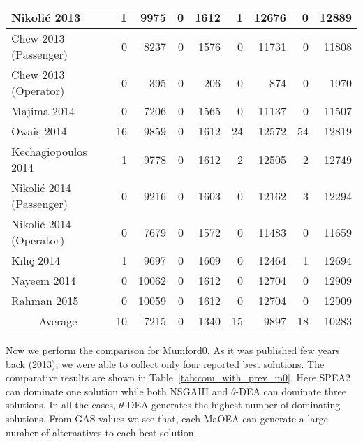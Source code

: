 \begin{table}[!htbp]
\begin{tabular}{|l|r|r||r|r||r|r||r|r|}
		\hline
		Nikoli{\'c} 2013~\cite{nikolic2013transit} & 1     & 9975  & 0     & 1612  & 1     & 12676 & 0     & 12889 \\
		\hline
		Chew 2013 (Passenger)~\cite{chew2013genetic} & 0     & 8237  & 0     & 1576  & 0     & 11731 & 0     & 11808 \\
		\hline
		Chew 2013 (Operator)~\cite{chew2013genetic} & 0     & 395   & 0     & 206   & 0     & 874   & 0     & 1970 \\
		\hline
		Majima 2014~\cite{majima2014application} & 0     & 7206  & 0     & 1565  & 0     & 11137 & 0     & 11507 \\
		\hline
		Owais 2014~\cite{owais2014simple} & 16    & 9859  & 0     & 1612  & 24    & 12572 & 54    & 12819 \\
		\hline
		Kechagiopoulos 2014~\cite{kechagiopoulos2014solving} & 1     & 9778  & 0     & 1612  & 2     & 12505 & 2     & 12749 \\
		\hline
		Nikoli{\'c} 2014 (Passenger)~\cite{nikolic2014simultaneous} & 0     & 9216  & 0     & 1603  & 0     & 12162 & 3     & 12294 \\
		\hline
		Nikoli{\'c} 2014 (Operator)~\cite{nikolic2014simultaneous} & 0     & 7679  & 0     & 1572  & 0     & 11483 & 0     & 11659 \\
		\hline
		K{\i}l{\i}{\c{c}} 2014~\cite{kilicc2014demand} & 1     & 9697  & 0     & 1609  & 0     & 12464 & 1     & 12694 \\
		\hline
		Nayeem 2014~\cite{nayeem2014transit} & 0     & 10062 & 0     & 1612  & 0     & 12704 & 0     & 12909 \\
		\hline
		Rahman 2015~\cite{rahman2015transit} & 0     & 10059 & 0     & 1612  & 0     & 12704 & 0     & 12909 \\
		\hline
		\hline
		\multicolumn{1}{|c|}{Average} & 10    & 7215  & 0     & 1340  & 15    & 9897  & 18    & 10283 \\
		\hline
	\end{tabular}%
	\label{tab:com_with_prev_mandl6}%
\end{table}%

 Now we perform the comparison for Mumford0. As it was published few years back (2013), we were able to collect only four reported best solutions. The comparative results are shown in Table~\ref{tab:com_with_prev_m0}. Here SPEA2 can dominate one solution while both NSGAIII and $\theta$-DEA can dominate three solutions. In all the cases, $\theta$-DEA generates the highest number of dominating solutions. From GAS values we see that, each MaOEA can generate a large number of alternatives to each best solution.

